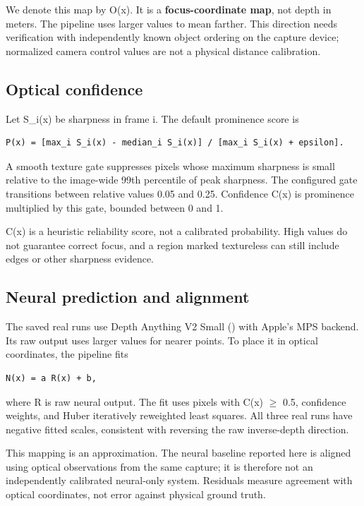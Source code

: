 \documentclass[11pt]{article}
\begin{document}
We denote this map by O(x). It is a \textbf{focus-coordinate map}, not depth in meters. The pipeline uses larger values to mean farther. This direction needs verification with independently known object ordering on the capture device; normalized camera control values are not a physical distance calibration.

\subsection{Optical confidence}

Let S\_i(x) be sharpness in frame i. The default prominence score is

\begin{lstlisting}[basicstyle=\ttfamily\small,breaklines=true,columns=fullflexible]
P(x) = [max_i S_i(x) - median_i S_i(x)] / [max_i S_i(x) + epsilon].
\end{lstlisting}

A smooth texture gate suppresses pixels whose maximum sharpness is small relative to the image-wide 99th percentile of peak sharpness. The configured gate transitions between relative values 0.05 and 0.25. Confidence C(x) is prominence multiplied by this gate, bounded between 0 and 1.

C(x) is a heuristic reliability score, not a calibrated probability. High values do not guarantee correct focus, and a region marked textureless can still include edges or other sharpness evidence.

\subsection{Neural prediction and alignment}

The saved real runs use Depth Anything V2 Small () with Apple's MPS backend. Its raw output uses larger values for nearer points. To place it in optical coordinates, the pipeline fits

\begin{lstlisting}[basicstyle=\ttfamily\small,breaklines=true,columns=fullflexible]
N(x) = a R(x) + b,
\end{lstlisting}

where R is raw neural output. The fit uses pixels with C(x) $\geq$ 0.5, confidence weights, and Huber iteratively reweighted least squares. All three real runs have negative fitted scales, consistent with reversing the raw inverse-depth direction.

This mapping is an approximation. The neural baseline reported here is aligned using optical observations from the same capture; it is therefore not an independently calibrated neural-only system. Residuals measure agreement with optical coordinates, not error against physical ground truth.
\end{document}
